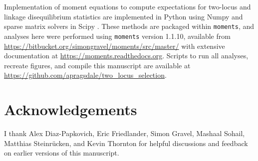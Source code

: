 \documentclass[]{article}
\begin{document}
Implementation of moment equations to compute expectations for two-locus and
linkage disequilibrium statistics are implemented in Python using Numpy
\citep{Harris2020-pc} and sparse matrix solvers in Scipy
\citep{Virtanen2020-kr}. These methods are packaged within \texttt{moments},
and analyses here were performed using \texttt{moments} version 1.1.10,
available from \url{https://bitbucket.org/simongravel/moments/src/master/} with
extensive documentation at \url{https://moments.readthedocs.org}. Scripts to
run all analyses, recreate figures, and compile this manuscript are available
at \url{https://github.com/apragsdale/two_locus_selection}.

\section{Acknowledgements}\label{acknowledgements}

I thank Alex Diaz-Papkovich, Eric Friedlander, Simon Gravel, Mashaal Sohail,
Matthias Steinrücken, and Kevin Thornton for helpful discussions and feedback
on earlier versions of this manuscript.

  

\end{document}
